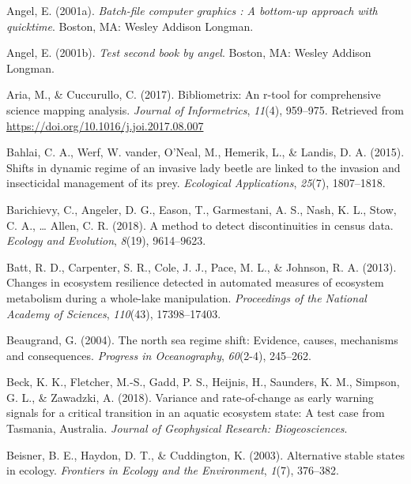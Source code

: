 \documentclass[12pt,twoside,openany]{reedthesis}
\begin{document}
\leavevmode\hypertarget{ref-angel2001}{}%
Angel, E. (2001a). \emph{Batch-file computer graphics : A bottom-up approach with quicktime}. Boston, MA: Wesley Addison Longman.

\leavevmode\hypertarget{ref-angel2002a}{}%
Angel, E. (2001b). \emph{Test second book by angel}. Boston, MA: Wesley Addison Longman.

\leavevmode\hypertarget{ref-bibliometrix}{}%
Aria, M., \& Cuccurullo, C. (2017). Bibliometrix: An r-tool for comprehensive science mapping analysis. \emph{Journal of Informetrics}, \emph{11}(4), 959--975. Retrieved from \url{https://doi.org/10.1016/j.joi.2017.08.007}

\leavevmode\hypertarget{ref-bahlai2015shifts}{}%
Bahlai, C. A., Werf, W. vander, O'Neal, M., Hemerik, L., \& Landis, D. A. (2015). Shifts in dynamic regime of an invasive lady beetle are linked to the invasion and insecticidal management of its prey. \emph{Ecological Applications}, \emph{25}(7), 1807--1818.

\leavevmode\hypertarget{ref-barichievy2018method}{}%
Barichievy, C., Angeler, D. G., Eason, T., Garmestani, A. S., Nash, K. L., Stow, C. A., \ldots{} Allen, C. R. (2018). A method to detect discontinuities in census data. \emph{Ecology and Evolution}, \emph{8}(19), 9614--9623.

\leavevmode\hypertarget{ref-batt2013changes}{}%
Batt, R. D., Carpenter, S. R., Cole, J. J., Pace, M. L., \& Johnson, R. A. (2013). Changes in ecosystem resilience detected in automated measures of ecosystem metabolism during a whole-lake manipulation. \emph{Proceedings of the National Academy of Sciences}, \emph{110}(43), 17398--17403.

\leavevmode\hypertarget{ref-beaugrand2004north}{}%
Beaugrand, G. (2004). The north sea regime shift: Evidence, causes, mechanisms and consequences. \emph{Progress in Oceanography}, \emph{60}(2-4), 245--262.

\leavevmode\hypertarget{ref-beck_variance_2018}{}%
Beck, K. K., Fletcher, M.-S., Gadd, P. S., Heijnis, H., Saunders, K. M., Simpson, G. L., \& Zawadzki, A. (2018). Variance and rate-of-change as early warning signals for a critical transition in an aquatic ecosystem state: A test case from Tasmania, Australia. \emph{Journal of Geophysical Research: Biogeosciences}.

\leavevmode\hypertarget{ref-beisner2003alternative}{}%
Beisner, B. E., Haydon, D. T., \& Cuddington, K. (2003). Alternative stable states in ecology. \emph{Frontiers in Ecology and the Environment}, \emph{1}(7), 376--382.
\end{document}
